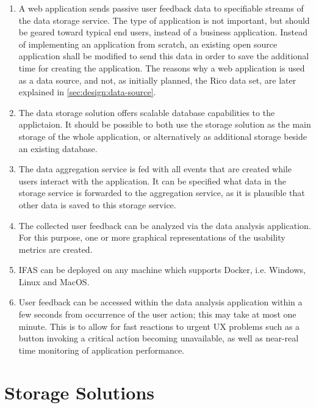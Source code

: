 \begin{enumerate}

\item A web application sends passive user feedback data to specifiable streams of the data storage service.
The type of application is not important, but should be geared toward typical end users, instead of a business application.
Instead of implementing an application from scratch, an existing open source application shall be modified to send this data in order to save the additional time for creating the application.
The reasons why a web application is used as a data source, and not, as initially planned, the Rico data set, are later explained in \cref{sec:design:data-source}.

\item The data storage solution offers scalable database capabilities to the applictaion.
It should be possible to both use the storage solution as the main storage of the whole application, or alternatively as additional storage beside an existing database.

\item The data aggregation service is fed with all events that are created while users interact with the application.
It can be specified what data in the storage service is forwarded to the aggregation service, as it is plausible that other data is saved to this storage service.

\item The collected user feedback can be analyzed via the data analysis application.
For this purpose, one or more graphical representations of the usability metrics are created.

\item \ac{IFAS} can be deployed on any machine which supports Docker, i.e. Windows, Linux and MacOS.

\item User feedback can be accessed within the data analysis application within a few seconds from occurrence of the user action; this may take at most one minute.
This is to allow for fast reactions to urgent \ac{UX} problems such as a button invoking a critical action becoming unavailable, as well as near-real time monitoring of application performance.
\end{enumerate}


\section{Storage Solutions}
\label{sec:classifications:storage}

